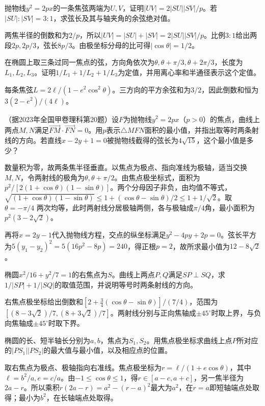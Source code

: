 抛物线\(y^2=2px\)的一条焦弦两端为\(U,V\)，证明\(|UV|=2|SU||SV|/p\)。若\(|SU|:|SV|=3:1\)，求弦长及其与轴夹角的余弦绝对值。
\par
\solutionanswer
两焦半径的倒数和为\(2/p\)，所以\(|UV|=|SU|+|SV|=2|SU||SV|/p\)。比例\(3:1\)给出两段\(2p,2p/3\)，弦长\(8p/3\)。由极坐标分母的比可得\(|\cos\theta|=1/2\)。


在椭圆上取三条过同一焦点的弦，方向角依次为\(\theta,\theta+\pi/3,\theta+2\pi/3\)，长度为\(L_1,L_2,L_3\)。证明\(1/L_1+1/L_2+1/L_3\)为定值，并用离心率和半通径表示这个定值。
\par
\solutionanswer
每条焦弦\(L=2\ell/(1-e^2\cos^2\theta)\)。三方向的平方余弦和为\(3/2\)，因此倒数和恒为\(3(2-e^2)/(4\ell)\)。


（据2023年全国甲卷理科第20题）设\(F\)为抛物线\(y^2=2px\)（\(p>0\)）的焦点，曲线上两点\(M,N\)满足\(\overrightarrow{FM}\cdot\overrightarrow{FN}=0\)。用\(p\)表示\(\triangle MFN\)面积的最小值，并指出取等时两条射线的方向。若直线\(x-2y+1=0\)被抛物线截得的弦长为\(4\sqrt{15}\)，这个最小值是多少？
\par
\solutionanswer
数量积为零，故两条焦半径垂直。以焦点为极点、指向准线为极轴，适当交换\(M,N\)，令两射线的极角为\(\theta,\theta+\pi/2\)。由焦点极坐标式，面积为 \(p^2/[2(1+\cos\theta)(1-\sin\theta)]\)。两个分母因子非负，由均值不等式，\(\sqrt{(1+\cos\theta)(1-\sin\theta)}\le 1+(\cos\theta-\sin\theta)/2\le1+1/\sqrt2\)。取 \(\theta=-\pi/4\) 两次均等，此时两射线分居极轴两侧，各与极轴成\(\pi/4\)角，最小面积为\(p^2(3-2\sqrt2)\)。

再将\(x=2y-1\)代入抛物线方程，交点的纵坐标满足\(y^2-4py+2p=0\)。弦长平方为\(5(y_1-y_2)^2=5(16p^2-8p)=240\)，得正根\(p=2\)，故所求最小值为\(12-8\sqrt2\)。


椭圆\(x^2/16+y^2/7=1\)的右焦点为\(S\)。曲线上两点\(P,Q\)满足\(SP\perp SQ\)，求\(1/|SP|+1/|SQ|\)的取值范围，并说明等号时两条射线的方向。
\par
\solutionanswer
右焦点极坐标给出倒数和\([2+\frac34(\cos\theta-\sin\theta)]/(7/4)\)，范围为\([(8-3\sqrt2)/7,(8+3\sqrt2)/7]\)。两射线分别与正向焦轴成\(\pm45^\circ\)时取上界，与负向焦轴成\(\pm45^\circ\)时取下界。


椭圆的长、短半轴长分别为\(a,b\)，焦点为\(S_1,S_2\)。用焦点极坐标求曲线上点\(P\)所对应的\(|PS_1||PS_2|\)的最大值与最小值，以及相应点的位置。
\par
\solutionanswer
取右焦点为极点、极轴指向右准线。焦点极坐标为\(r=\ell/(1+e\cos\theta)\)，其中\(\ell=b^2/a,e=c/a\)。由\(-1\le\cos\theta\le1\)，得\(r\in[a-c,a+c]\)，另一焦半径为\(2a-r\)。所以乘积\(r(2a-r)=a^2-(r-a)^2\)最大为\(a^2\)，在\(r=a\)即短轴端点处取得；最小为\(b^2\)，在长轴端点处取得。



